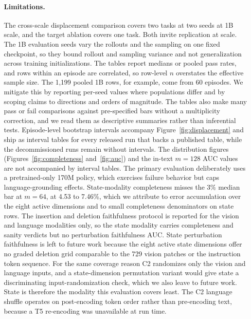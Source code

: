 \documentclass{article}
\begin{document}
\paragraph{Limitations.}
The cross-scale displacement comparison covers two tasks at two seeds at 1B scale, and the target ablation covers one task.
Both invite replication at scale.
The 1B evaluation seeds vary the rollouts and the sampling on one fixed checkpoint, so they bound rollout and sampling variance and not generalization across training initializations.
The tables report medians or pooled pass rates, and rows within an episode are correlated, so row-level $n$ overstates the effective sample size.
The 1{,}199 pooled 1B rows, for example, come from 60 episodes.
We mitigate this by reporting per-seed values where populations differ and by scoping claims to directions and orders of magnitude.
The tables also make many pass or fail comparisons against pre-specified bars without a multiplicity correction, and we read them as descriptive summaries rather than inferential tests.
Episode-level bootstrap intervals accompany Figure~\ref{fig:displacement} and ship as interval tables for every released run that backs a published table, while the decommissioned runs remain without intervals.
The distribution figures (Figures~\ref{fig:completeness} and~\ref{fig:auc}) and the in-text $m{=}128$ AUC values are not accompanied by interval tables.
The primary evaluation deliberately uses a pretrained-only 170M policy, which exercises failure behavior but caps language-grounding effects.
State-modality completeness misses the 3\% median bar at $m{=}64$, at 4.53 to 7.46\%, which we attribute to error accumulation over the eight active dimensions and to small completeness denominators on state rows.
The insertion and deletion faithfulness protocol is reported for the vision and language modalities only, so the state modality carries completeness and sanity verdicts but no perturbation faithfulness AUC.
State perturbation faithfulness is left to future work because the eight active state dimensions offer no graded deletion grid comparable to the 729 vision patches or the instruction token sequence.
For the same coverage reason C2 randomizes only the vision and language inputs, and a state-dimension permutation variant would give state a discriminating input-randomization check, which we also leave to future work.
State is therefore the modality this evaluation covers least.
The C2 language shuffle operates on post-encoding token order rather than pre-encoding text, because a T5 re-encoding was unavailable at run time.
\end{document}
